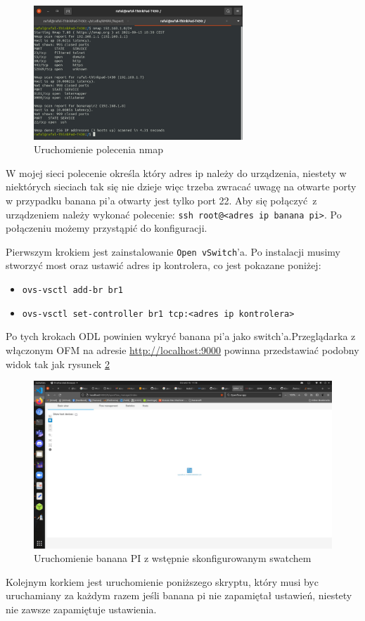 \documentclass[12pt,a4paper,twoside]{article}
\newcounter{rok}
\begin{document}
\begin{figure}[!h]
	\centering\includegraphics[width=0.7\textwidth]{nmap.jpg}
	\caption{Uruchomienie polecenia nmap} \label{nmap}
\end{figure}

W mojej sieci polecenie określa który adres ip należy do urządzenia, niestety w niektórych sieciach tak się nie dzieje więc trzeba zwracać uwagę na otwarte porty w przypadku banana pi'a  otwarty jest tylko port 22. Aby się połączyć z urządzeniem należy wykonać polecenie: \texttt{ssh root@<adres ip banana pi>}. Po połączeniu możemy przystąpić do konfiguracji. 
\par Pierwszym krokiem jest zainstalowanie \texttt{Open vSwitch}'a. Po instalacji musimy stworzyć most oraz ustawić adres ip kontrolera, co jest pokazane poniżej:
\begin{itemize}
	\item\texttt{ovs-vsctl add-br br1}  
	\item\texttt{ovs-vsctl set-controller br1 tcp:<adres ip kontrolera>}
\end{itemize}

Po tych krokach ODL powinien wykryć banana pi'a jako switch'a.Przeglądarka z włączonym OFM na adresie \url{http://localhost:9000} powinna przedstawiać podobny widok tak jak rysunek \ref{OFM_banana}
 
 \begin{figure}[!h]
 	\centering\includegraphics[width=1\textwidth]{OFM_banana.jpg}
 	\caption{Uruchomienie banana PI z wstępnie skonfigurowanym swatchem } \label{OFM_banana}
 \end{figure}
 \newpage
\par Kolejnym korkiem jest uruchomienie poniższego skryptu, który musi byc uruchamiany za każdym razem jeśli banana pi nie zapamiętał ustawień, niestety nie zawsze zapamiętuje ustawienia. 
\end{document}
